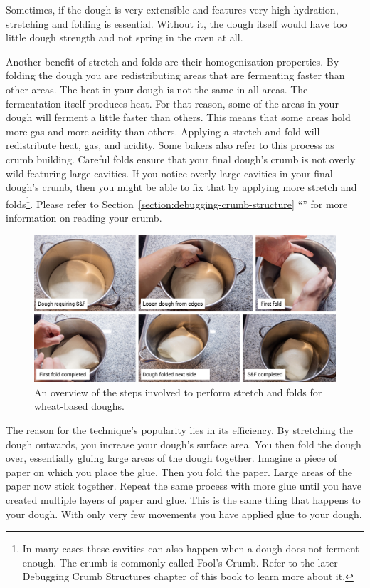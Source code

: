 Sometimes, if the dough is very extensible
and features very high hydration, stretching and folding is essential.
Without it, the dough itself would have too little dough strength and not
spring in the oven at all.

Another benefit of stretch and folds are their homogenization properties. By
folding the dough you are redistributing areas that are fermenting faster
than other areas. The heat in your dough is not the same in all areas.
The fermentation itself produces heat. For that reason, some of the areas in
your dough will ferment a little faster than others. This means that some
areas hold more gas and more acidity than others. Applying a stretch and fold
will redistribute heat, gas, and acidity. Some bakers also refer to this
process as crumb building. Careful folds ensure that your final dough's crumb
is not overly wild featuring large cavities. If you notice overly
large cavities in your final dough's crumb, then you might be able to fix that
by applying more stretch and folds\footnote{In many cases these cavities can
also happen when a dough does not ferment enough. The crumb is commonly called
Fool's Crumb. Refer to the later Debugging Crumb Structures chapter of this
book to learn more about it.}. Please refer to Section~\ref{section:debugging-crumb-structure}
``'' for more information on reading
your crumb.

\begin{figure}[!htb]
  \includegraphics[width=\textwidth]{stretch-and-fold-steps}
  \caption[Stretch and fold steps]{An overview of the steps involved to perform
      stretch and folds for wheat-based doughs.}%
  \label{figure:stretch-and-fold-steps}
\end{figure}

The reason for the technique's popularity lies in its efficiency. By stretching
the dough outwards, you increase your dough's surface area. You then fold the
dough over, essentially gluing large areas of the dough together. Imagine a
piece of paper on which you place the glue. Then you fold the paper. Large areas
of the paper now stick together. Repeat the same process with more glue until
you have created multiple layers of paper and glue. This is the same thing that
happens to your dough. With only very few movements you have applied glue to your
dough.

